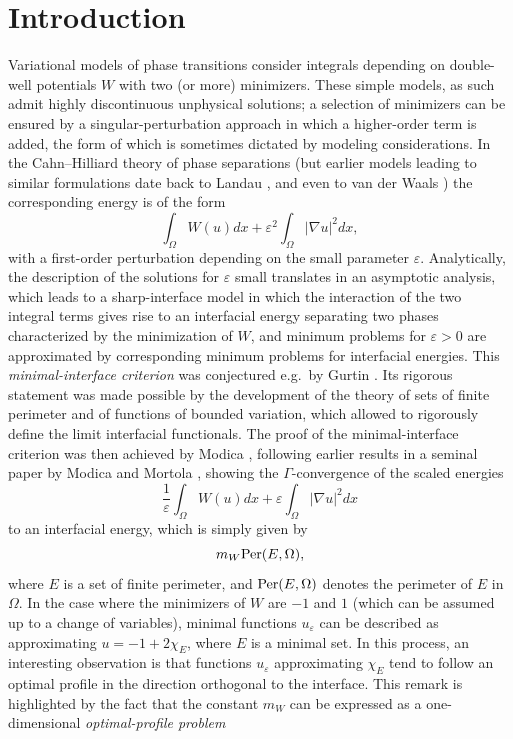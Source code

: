 \documentclass{article}
\newcommand{\e}{\varepsilon}
\begin{document}
\section{Introduction}
Variational models of phase transitions consider integrals depending on double-well potentials $W$ with two (or more) minimizers. These simple models, as such admit highly discontinuous unphysical solutions; a selection of minimizers can be ensured by a singular-perturbation approach in which a higher-order term is added, the form of which is sometimes dictated by modeling considerations. In the Cahn--Hilliard theory of phase separations \cite{CH} (but earlier models leading to similar formulations date back to Landau \cite{Landau}, and even to van der Waals \cite{vdW}) the corresponding energy is of the form
$$
\int_\Omega W(u)dx+\e^2\int_\Omega|\nabla u|^2dx,
$$
with a first-order perturbation depending on the small parameter $\e$. Analytically, the description of the solutions for $\e$ small translates in an asymptotic analysis, which leads to a sharp-interface model in which the interaction of the two integral terms gives rise to an interfacial energy separating two phases characterized by the minimization of $W$, and minimum problems for $\e>0$ are approximated by corresponding minimum problems for interfacial energies. This {\em minimal-interface criterion} was conjectured e.g.~by Gurtin  \cite{gurtin}. Its rigorous statement was made possible by the development of the theory of sets of finite perimeter and of functions of bounded variation, which allowed to rigorously define the limit interfacial functionals. The proof of the minimal-interface criterion was then achieved by Modica \cite{Modica}, following earlier results in a seminal paper by Modica and Mortola \cite{MM}, showing the $\Gamma$-convergence of the scaled energies
$$
\frac1\e\int_\Omega W(u)dx+\e\int_\Omega|\nabla u|^2dx
$$
to an interfacial energy, which is simply given by
$$
m_W {\rm Per}(E,\Omega),
$$
where $E$ is a set of finite perimeter, and ${\rm Per}(E,\Omega)$ denotes the perimeter of $E$ in $\Omega$. In the case where the minimizers of $W$ are $-1$ and $1$ (which can be assumed up to a change of variables), minimal functions $u_\e$ can be described as approximating  $u=-1+2\chi_E$, where $E$ is a minimal set.
In this process, an interesting observation is that functions $u_\e$ approximating $\chi_E$ tend to follow an optimal profile in the direction orthogonal to the interface.
This remark is highlighted by the fact that the constant $m_W$ can be expressed as a one-dimensional {\em optimal-profile problem}
\end{document}
